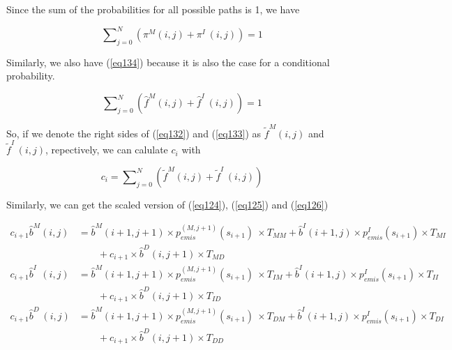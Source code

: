 \documentclass[10pt]{article}
\begin{document}
    Since the sum of the probabilities for all possible paths is 1, we have

    \begin{equation}
      \sum\nolimits_{j=0}^{N} \left( \pi^{M}(i, j) + \pi^{I\;}(i, j) \right) = 1
    \end{equation}

    Similarly, we also have (\ref{eq134}) because it is also the case for a conditional probability.

    \begin{equation} \label{eq134}
      \sum\nolimits_{j=0}^{N} \left( \widehat{f}^{M}(i, j) + \widehat{f}^{I\;}(i, j) \right) = 1
    \end{equation}

    So, if we denote the right sides of (\ref{eq132}) and (\ref{eq133}) as $\widetilde{f}^{M}(i, j)$ and $\widetilde{f}^{I\;}(i, j)$, repectively, we can calulate $c_{i}$ with 

    \begin{equation}
      c_{i} = \sum\nolimits_{j=0}^{N} \left( \widetilde{f}^{M}(i, j) + \widetilde{f}^{I\;}(i, j) \right)
    \end{equation}

    Similarly, we can get the scaled version of (\ref{eq124}), (\ref{eq125}) and (\ref{eq126})

    \begin{equation}
    \begin{aligned}
      c_{i+1} \widehat{b}^{M}(i, j) &= \widehat{b}^M(i+1, j+1) \times p_{emis}^{(M, j+1)}(s_{i+1}) \
        \times T_{MM} + \widehat{b}^{I}(i+1, j) \times p_{emis}^{I}(s_{i+1}) \times T_{MI} \\
                 &\qquad+ c_{i+1} \times \widehat{b}^{D}(i, j+1) \times T_{MD} \\
      c_{i+1} \widehat{b}^{I\;\;}(i, j) &= \widehat{b}^M(i+1, j+1) \times p_{emis}^{(M, j+1)}(s_{i+1}) \
        \times T_{IM} + \widehat{b}^{I}(i+1, j) \times p_{emis}^{I}(s_{i+1}) \times T_{II} \\
                  &\qquad+ c_{i+1} \times \widehat{b}^{D}(i, j+1) \times T_{ID} \\
      c_{i+1} \widehat{b}^{D\;}(i, j) &= \widehat{b}^M(i+1, j+1) \times p_{emis}^{(M, j+1)}(s_{i+1}) \
        \times T_{DM} + \widehat{b}^{I}(i+1, j) \times p_{emis}^{I}(s_{i+1}) \times T_{DI} \\
                  &\qquad+ c_{i+1} \times \widehat{b}^{D}(i, j+1) \times T_{DD}
    \end{aligned}
    \end{equation}
\end{document}
